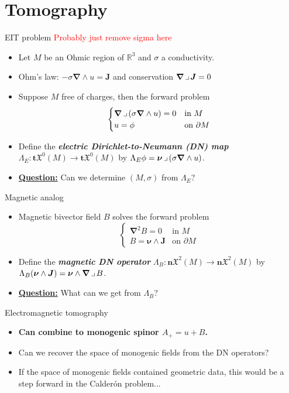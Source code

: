 \documentclass[aspectratio=169,handout]{beamer}
\newcommand\boldgreen[1]{\textcolor{lighter_csu_green}{\emph{\textbf{#1}}}}
\newcommand\boldgold[1]{\textcolor{csu_gold}{\textbf{#1}}}
\newcommand{\tangentpart}{\boldsymbol{t}}
\newcommand{\normalpart}{\boldsymbol{n}}
\newcommand{\R}{\mathbb{R}}
\newcommand{\grad}{\boldsymbol{\nabla}}
\newcommand{\blade}[1]{\boldsymbol{#1}}
\newcommand{\normal}{\blade{\nu}}
\newcommand{\contract}{\hspace*{.5mm} \lrcorner \hspace*{.5mm}}
\newcommand{\smoothfields}{\mathfrak{X}}
\begin{document}
\section{Tomography}


\begin{frame}{EIT problem}
\vfill
\textcolor{red}{Probably just remove sigma here}
\begin{itemize}
\pause
\item Let $M$ be an Ohmic region of $\R^3$ and $\sigma$ a conductivity.
\pause
\item Ohm's law: $-\sigma \grad\wedge u =\blade{J}$ and conservation $\grad \contract \blade{J}=0$
\pause
\item Suppose $M$ free of charges, then the forward problem
\[
\begin{cases}
\grad \contract (\sigma \grad \wedge u) = 0 & \textrm{in $M$}\\
u = \phi & \textrm{on $\partial M$}
\end{cases}
\]
\pause
\item Define the \boldgreen{electric Dirichlet-to-Neumann (DN) map} $\Lambda_E \colon \tangentpart \smoothfields^0(M) \to \tangentpart \smoothfields^0(M)$ by $\Lambda_E\phi = \normal \contract (\sigma \grad \wedge u)$.
\pause
\item \textbf{\underline{Question:}} Can we determine $(M,\sigma)$ from $\Lambda_E$?
\end{itemize}
\vfill
\end{frame}

\begin{frame}{Magnetic analog}
\vfill
\begin{itemize}
\pause
\item Magnetic bivector field $B$ solves the forward problem
\[
\begin{cases}
\grad^2 B = 0 & \textrm{in $M$}\\
B = \normal \wedge \blade{J} & \textrm{on $\partial M$}
\end{cases}
\]
\pause
\item Define the \boldgreen{magnetic DN operator} $\Lambda_B \colon \normalpart \smoothfields^2(M) \to \normalpart \smoothfields^2(M)$ by $\Lambda_B(\normal \wedge \blade{J}) = \normal \wedge \grad \contract B$.
\pause
\item \textbf{\underline{Question:}} What can we get from $\Lambda_B$?
\end{itemize}
\vfill
\end{frame}

\begin{frame}{Electromagnetic tomography}
\vfill
\begin{itemize}
\pause
\item \boldgold{Can combine to monogenic spinor $A_+=u+B$.}
\pause
\item Can we recover the space of monogenic fields from the DN operators?
\pause
\item If the space of monogenic fields contained geometric data, this would be a step forward in the Calder\'on problem...
\end{itemize}
\vfill
\end{frame}
\end{document}

